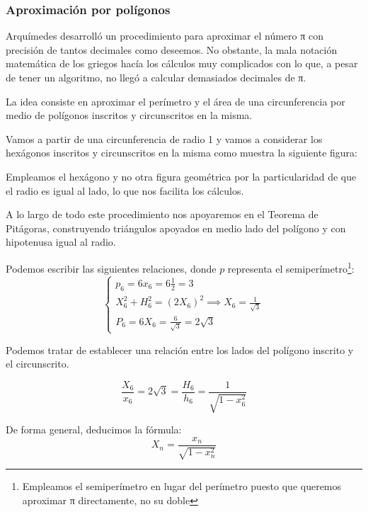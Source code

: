 \documentclass{apuntes}
\begin{document}
\subsubsection{Aproximación por polígonos}
Arquímedes desarrolló un procedimiento para aproximar el número π con precisión de tantos decimales como deseemos. No obstante, la mala notación matemática de los griegos hacía los cálculos muy complicados con lo que, a pesar de tener un algoritmo, no llegó a calcular demasiados decimales de π.


La idea consiste en aproximar el perímetro y el área de una circunferencia por medio de polígonos inscritos y circunscritos en la misma.

Vamos a partir de una circunferencia de radio 1 y vamos a considerar los hexágonos inscritos y circunscritos en la misma como muestra la siguiente figura:


\begin{minipage}{0.47\textwidth}
\begin{center}
\end{center}
\end{minipage}
\begin{minipage}{0.52\textwidth}
\obs Empleamos el hexágono y no otra figura geométrica por la particularidad de que el radio es igual al lado, lo que nos facilita los cálculos.

\obs A lo largo de todo este procedimiento nos apoyaremos en el Teorema de Pitágoras, construyendo triángulos apoyados en medio lado del polígono y con hipotenusa igual al radio.
\end{minipage}


Podemos escribir las siguientes relaciones, donde $p$ representa el semiperímetro\footnote{Empleamos el semiperímetro en lugar del perímetro puesto que queremos aproximar π directamente, no su doble}:
\[\left\{ \begin{array}{l}
p_6 = 6x_6 = 6 \frac{1}{2} = 3\\
X_6^2+H_6^2=(2X_6)^2 \implies X_6 = \frac{1}{\sqrt{3}}\\
P_6 = 6X_6 = \frac{6}{\sqrt{3}} = 2\sqrt{3}
\end{array}\right.\]

Podemos tratar de establecer una relación entre los lados del polígono inscrito y el circunscrito.

\[\frac{X_6}{x_6} = 2\sqrt{3} = \frac{H_6}{h_6} = \frac{1}{\sqrt{1-x_6^2}}\]

De forma general, deducimos la fórmula:
\[X_n=\frac{x_n}{\sqrt{1-x_n^2}}\]
\end{document}
